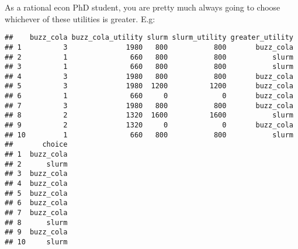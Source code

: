 \documentclass[]{article}
\newenvironment{Shaded}{\begin{snugshade}}{\end{snugshade}}
\newcommand{\KeywordTok}[1]{\textcolor[rgb]{0.13,0.29,0.53}{\textbf{#1}}}
\newcommand{\DataTypeTok}[1]{\textcolor[rgb]{0.13,0.29,0.53}{#1}}
\newcommand{\DecValTok}[1]{\textcolor[rgb]{0.00,0.00,0.81}{#1}}
\newcommand{\StringTok}[1]{\textcolor[rgb]{0.31,0.60,0.02}{#1}}
\newcommand{\CommentTok}[1]{\textcolor[rgb]{0.56,0.35,0.01}{\textit{#1}}}
\newcommand{\OperatorTok}[1]{\textcolor[rgb]{0.81,0.36,0.00}{\textbf{#1}}}
\newcommand{\NormalTok}[1]{#1}
\begin{document}
As a rational econ PhD student, you are pretty much always going to
choose whichever of these utilities is greater. E.g:

\begin{Shaded}
\end{Shaded}

\begin{verbatim}
##    buzz_cola buzz_cola_utility slurm slurm_utility greater_utility
## 1          3              1980   800           800       buzz_cola
## 2          1               660   800           800           slurm
## 3          1               660   800           800           slurm
## 4          3              1980   800           800       buzz_cola
## 5          3              1980  1200          1200       buzz_cola
## 6          1               660     0             0       buzz_cola
## 7          3              1980   800           800       buzz_cola
## 8          2              1320  1600          1600           slurm
## 9          2              1320     0             0       buzz_cola
## 10         1               660   800           800           slurm
##       choice
## 1  buzz_cola
## 2      slurm
## 3  buzz_cola
## 4  buzz_cola
## 5  buzz_cola
## 6  buzz_cola
## 7  buzz_cola
## 8      slurm
## 9  buzz_cola
## 10     slurm
\end{verbatim}
\end{document}
